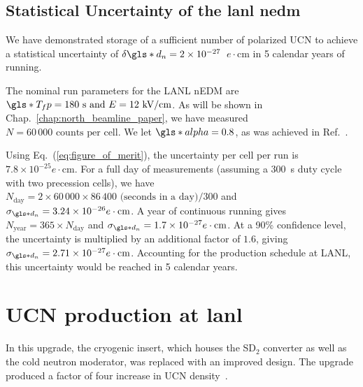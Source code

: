 
\subsection
{
    \texorpdfstring{Statistical Uncertainty of the \acrshort{lanl} \acrshort{nedm}}
                    {Statistical Uncertainty of the LANL nEDM}
}


We have demonstrated storage of a sufficient number of polarized UCN to achieve a statistical uncertainty of $\delta \gls*{d_n} = 2\times 10^{-27}$~$e\cdot\text{cm}$ in 5 calendar years of running.

The nominal run parameters for the LANL nEDM are $\gls*{T_fp}=180\text{ s and } E=12\text{ kV/cm}$. As will be shown in Chap.~\ref{chap:north_beamline_paper}, we have measured $N=60\,000\text{ counts per cell}$. We let $\gls*{alpha}=0.8$, as was achieved in Ref.~\cite{ABE20}.

Using Eq.~(\ref{eq:figure_of_merit}), the uncertainty per cell per run is $7.8 \times 10^{-25}e\cdot\text{cm}$. For a full day of measurements (assuming a \qty{300}{\s} duty cycle with two precession cells), we have $N_\text{day}=2\times60\,000\times86\,400\text{ (seconds in a day)}/300$ and $\sigma_{\gls*{d_n}}=3.24\times10^{-26}e\cdot\text{cm}$. A year of continuous running gives $N_\text{year}=365\times N_\text{day}$ and $\sigma_{\gls*{d_n}}=1.7\times10^{-27}e\cdot\text{cm}$. At a 90\% confidence level, the uncertainty is multiplied by an additional factor of $1.6$, giving $\sigma_{\gls*{d_n}}=2.71\times10^{-27}e\cdot\text{cm}$. Accounting for the production schedule at LANL, this uncertainty would be reached in 5 calendar years.


\section
{
    \texorpdfstring{UCN production at \acrshort{lanl}}
                   {UCN production at LANL}
}\label{sec:lanl_ucn_source}


In this upgrade, the cryogenic insert, which houses the SD$_2$ converter as well as the cold neutron moderator, was replaced with an improved design. The upgrade produced a factor of four increase in UCN density~\cite{ito_performance_2018}.

